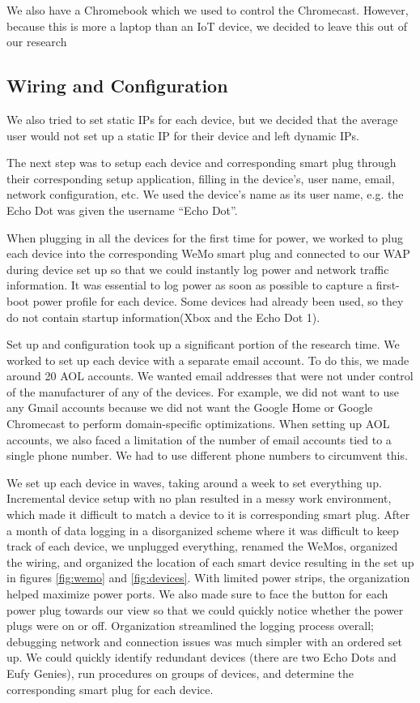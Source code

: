 We also have a Chromebook which we used to control the Chromecast. However, because this is more a laptop than an IoT device, we decided to leave this out of our research

\subsection{Wiring and Configuration}

We also tried to set static IPs for each device, but we decided that the average user would not set up a static IP for their device and left dynamic IPs.

The next step was to setup each device and corresponding smart plug through their corresponding setup application, filling in the device's, user name, email, network configuration, etc. We used the device's name as its user name, e.g. the Echo Dot was given the username ``Echo Dot''.

When plugging in all the devices for the first time for power, we worked to plug each device into the corresponding WeMo smart plug and connected to our WAP during device set up so that we could instantly log power and network traffic information. It was essential to log power as soon as possible to capture a first-boot power profile for each device. Some devices had already been used, so they do not contain startup information(Xbox and the Echo Dot 1).

Set up and configuration took up a significant portion of the research time. We worked to set up each device with a separate email account. To do this, we made around 20 AOL accounts. We wanted email addresses that were not under control of the manufacturer of any of the devices. For example, we did not want to use any Gmail accounts because we did not want the Google Home or Google Chromecast to perform domain-specific optimizations. When setting up AOL accounts, we also faced a limitation of the number of email accounts tied to a single phone number. We had to use different phone numbers to circumvent this.

We set up each device in waves, taking around a week to set everything up. Incremental device setup with no plan resulted in a messy work environment, which made it difficult to match a device to it is corresponding smart plug. After a month of data logging in a disorganized scheme where it was difficult to keep track of each device, we unplugged everything, renamed the WeMos, organized the wiring, and organized the location of each smart device resulting in the set up in figures \ref{fig:wemo} and \ref{fig:devices}. With limited power strips, the organization helped maximize power ports. We also made sure to face the button for each power plug towards our view so that we could quickly notice whether the power plugs were on or off. Organization streamlined the logging process overall; debugging network and connection issues was much simpler with an ordered set up. We could quickly identify redundant devices (there are two Echo Dots and Eufy Genies), run procedures on groups of devices, and determine the corresponding smart plug for each device.

